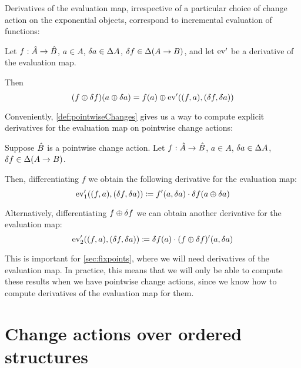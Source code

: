 Derivatives of the evaluation map, irrespective of a particular choice of change action on the
exponential objects, correspond to incremental evaluation of functions:
\begin{prop}
\label{prop:incrementalization}
  Let $f: \hat{A} \rightarrow \hat{B}$, $a \in A$, $\delta a \in
  \Delta A$, $\delta f \in \Delta (A \rightarrow B)$, and let
  $\operatorname{ev}'$ be a derivative of the evaluation map.

  Then
  \begin{displaymath}
    (f \oplus \delta f)(a \oplus \delta a) = f(a) \oplus \operatorname{ev}'((f, a), (\delta f, \delta a))
  \end{displaymath}
\end{prop}

Conveniently, \cref{def:pointwiseChanges} gives us a way to compute explicit derivatives for
the evaluation map on pointwise change actions:

\begin{prop}
\label{prop:evDerivatives}
  Suppose $\hat{B}$ is a pointwise change action. Let
  $f: \hat{A} \rightarrow \hat{B}$,
  $a \in A$, $\delta a \in \Delta A$,
  $\delta f \in \Delta (A \rightarrow B)$.

  Then, differentiating $f$ we obtain the following derivative for the evaluation map:
  \begin{displaymath}
    \operatorname{ev}'_1((f, a), (\delta f, \delta a)) \coloneqq f'(a, \delta a) \cdot \delta f(a \oplus \delta a)
  \end{displaymath}

  Alternatively, differentiating $f \oplus \delta f$ we can obtain another derivative
  for the evaluation map:
  \begin{displaymath}
    \operatorname{ev}'_2((f, a), (\delta f, \delta a)) \coloneqq \delta f(a) \cdot (f \oplus \delta f)'(a, \delta a)
  \end{displaymath}
\end{prop}

This is important for \cref{sec:fixpoints}, where we will need derivatives of
the evaluation map. In practice, this means that we will only be able to compute
these results when we have pointwise change actions, since we know how to
compute derivatives of the evaluation map for them.

\section{Change actions over ordered structures}
\label{sec:moreStructures}

